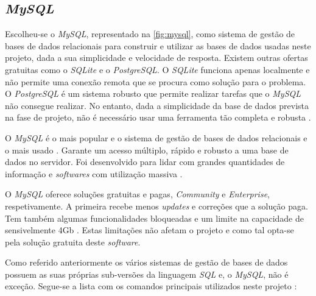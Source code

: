 \documentclass[11pt,twoside,a4paper]{report}
\begin{document}
\subsection{\textit{MySQL}}
\label{subchap:mysql}
Escolheu-se o \textit{MySQL}, representado na \autoref{fig:mysql}, como sistema de gestão de bases de dados relacionais para construir e utilizar as bases de dados usadas neste projeto, dada a sua simplicidade e velocidade de resposta. Existem outras ofertas gratuitas como o \textit{SQLite} e o \textit{PostgreSQL}. O \textit{SQLite} funciona apenas localmente e não permite uma conexão remota que se procura como solução para o problema. O \textit{PostgreSQL} é um sistema robusto que permite realizar tarefas que o \textit{MySQL} não consegue realizar. No entanto, dada a simplicidade da base de dados prevista na fase de projeto, não é necessário usar uma ferramenta tão completa e robusta \cite{mysqlvs}.\par 
O \textit{MySQL} é o mais popular e o sistema de gestão de bases de dados relacionais e o mais usado \cite{mysqlvs}. Garante um acesso múltiplo, rápido e robusto a uma base de dados no servidor. Foi desenvolvido para lidar com grandes quantidades de informação e \textit{softwares} com utilização massiva \cite{mysql}.\par 
O \textit{MySQL} oferece soluções gratuitas e pagas, \textit{Community} e \textit{Enterprise}, respetivamente. A primeira recebe menos \textit{updates} e correções que a solução paga. Tem também algumas funcionalidades bloqueadas e um limite na capacidade de sensivelmente 4Gb \cite{mysql}. Estas limitações não afetam o projeto e como tal opta-se pela solução gratuita deste \textit{software}.\par
Como referido anteriormente os vários sistemas de gestão de bases de dados possuem as suas próprias sub-versões da linguagem \textit{SQL} e, o \textit{MySQL}, não é exceção. Segue-se a lista com os comandos principais utilizados neste projeto \cite{mysql}:
\end{document}
